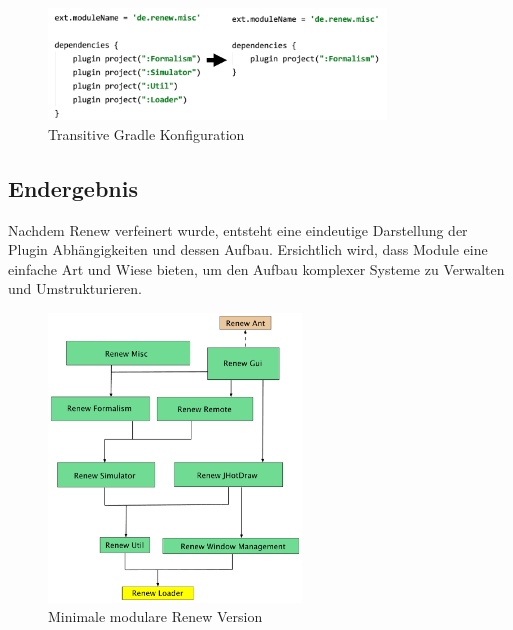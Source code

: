 	\begin{figure}[h!]
	  \centering
	  \includegraphics[width=0.8\textwidth]{material/images/gradle_misc.png}
	  \caption{Transitive Gradle Konfiguration}
	  \label{fig:trans_gradle}
	\end{figure}

\subsection{Endergebnis} \label{sub:endergebnis}
	Nachdem Renew verfeinert wurde, entsteht eine eindeutige Darstellung der Plugin Abhängigkeiten und dessen Aufbau. Ersichtlich wird, dass Module eine einfache Art und Wiese bieten, um den Aufbau komplexer Systeme zu Verwalten und Umstrukturieren.

	\begin{figure}[h!]
	  \centering
	  \includegraphics[width=0.6\textwidth]{material/images/renew_plugin_dependencies-migrate_opt.pdf}
	  \caption{Minimale modulare Renew Version}
	  \label{fig:trans_config}
	\end{figure}
